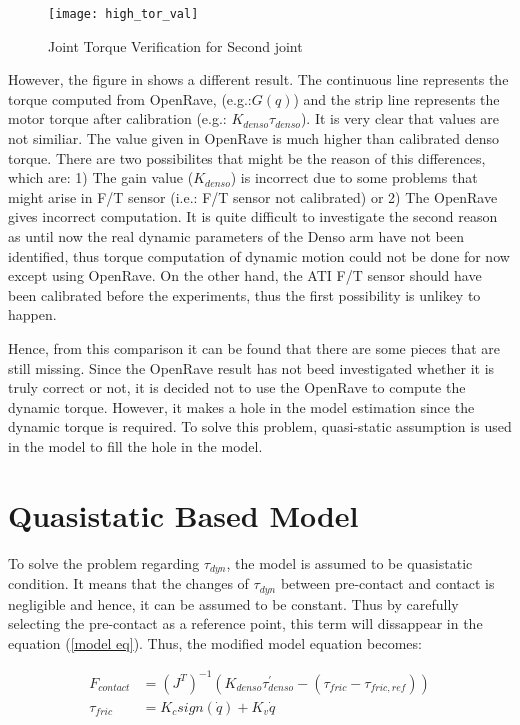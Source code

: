 \begin{figure}[H]
    \centering
    \texttt{[image: high\_tor\_val]}
    \caption{Joint Torque Verification for Second joint}
    \label{fig: tor verification}
\end{figure}

However, the figure in  shows a different result. The continuous line represents the torque computed from OpenRave, (e.g.:$G\left(q \right)$) and the strip line represents the motor torque after calibration (e.g.: $K_{denso} \tau_{denso}$). It is very clear that values are not similiar. The value given in OpenRave is much higher than calibrated denso torque. There are two possibilites that might be the reason of this differences, which are: 1) The gain value ($ K_{denso} $) is incorrect due to some problems that might arise in F/T sensor (i.e.: F/T sensor not calibrated) or 2) The OpenRave gives incorrect computation. It is quite difficult to investigate the second reason as until now the real dynamic parameters of the Denso arm have not been identified, thus torque computation of dynamic motion could not be done for now except using OpenRave. On the other hand, the ATI F/T sensor should have been calibrated before the experiments, thus the first possibility is unlikey to happen. 

Hence, from this comparison it can be found that there are some pieces that are still missing. Since the OpenRave result has not beed investigated whether it is truly correct or not, it is decided not to use the OpenRave to compute the dynamic torque. However, it makes a hole in the model estimation since the dynamic torque is required. To solve this problem, quasi-static assumption is used in the model to fill the hole in the model. 

\section{Quasistatic Based Model}

To solve the problem regarding $\tau_{dyn}$, the model is assumed to be quasistatic condition. It means that the changes of $\tau_{dyn}$ between pre-contact and contact is negligible and hence, it can be assumed to be constant. Thus by carefully selecting the pre-contact as a reference point, this term will dissappear in the equation (\ref{model eq}). Thus, the modified model equation becomes:

\begin{align}
\label{quasistatic}
  F_{contact} &= \left(J^{T}\right)^{-1} \left( K_{denso} \tau_{denso}^{\prime} -  \left(\tau_{fric} - \tau_{fric , ref}\right)\right)\\
  \tau_{fric} &= K_{c} sign\left(\dot{q}\right) + K_{v} \dot{q} 
\end{align}

